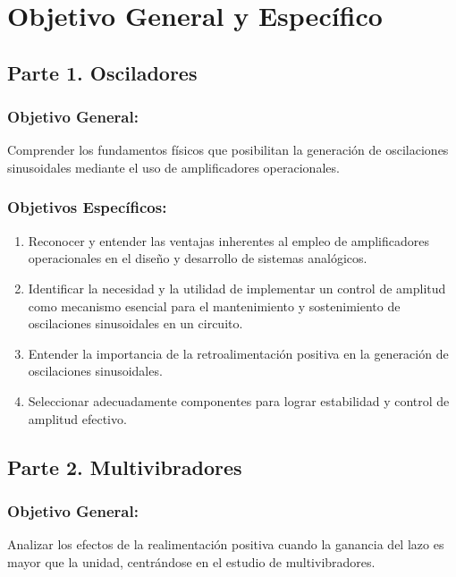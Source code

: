 
\section{Objetivo General y Específico}

    \subsection*{Parte 1. Osciladores}
    
        \subsubsection*{Objetivo General:}
        Comprender los fundamentos físicos que posibilitan la generación de oscilaciones sinusoidales mediante el uso de amplificadores operacionales.
        
        \subsubsection*{Objetivos Específicos:}
        \begin{enumerate}
            \item Reconocer y entender las ventajas inherentes al empleo de amplificadores operacionales en el diseño y desarrollo de sistemas analógicos.
            \item Identificar la necesidad y la utilidad de implementar un control de amplitud como mecanismo esencial para el mantenimiento y sostenimiento de oscilaciones sinusoidales en un circuito.
            \item  Entender la importancia de la retroalimentación positiva en la generación de oscilaciones sinusoidales.
            \item Seleccionar adecuadamente componentes para lograr estabilidad y control de amplitud efectivo.
        \end{enumerate}
    
    \subsection*{Parte 2. Multivibradores}
    
        \subsubsection*{Objetivo General:}
        Analizar los efectos de la realimentación positiva cuando la ganancia del lazo es mayor que la unidad, centrándose en el estudio de multivibradores.
        
